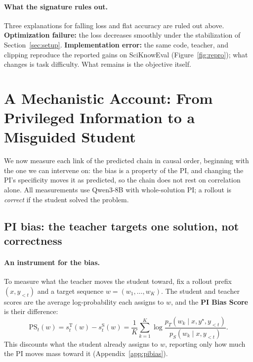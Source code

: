 \documentclass{article}
\newcommand{\ysol}{y^{\star}}               %
\newcommand{\sstud}{s^{\mathrm{S}}}          %
\newcommand{\steach}{s^{\mathrm{T}}}         %
\newcommand{\pibias}{\mathrm{PS}}            %
\begin{document}
\newcommand{\sddelta}[1]{%
  \ifnum\fpeval{#1 > 0}=1
    \textbf{\textcolor{chgpos}{$+#1$}}%
  \else
    \ifnum\fpeval{#1 < 0}=1
      \textbf{\textcolor{chgneg}{$#1$}}%
    \else
      \textbf{\textcolor{gray}{0.0}}%
    \fi
  \fi
}
\vspace{-5pt}
\paragraph{What the signature rules out.}
\label{sec:rulesout}
Three explanations for falling loss and flat accuracy are ruled out above. \textbf{Optimization failure:} the loss decreases smoothly under the stabilization of Section~\ref{sec:setup}. \textbf{Implementation error:} the same code, teacher, and clipping reproduce the reported gains on SciKnowEval (Figure~\ref{fig:repro}); what changes is task difficulty. What remains is the objective itself.
\section{A Mechanistic Account: From Privileged Information to a Misguided Student}
\label{sec:chain}

We now measure each link of the predicted chain in causal order, beginning with the one we can intervene on: the bias is a property of the PI, and changing the PI's specificity moves it as predicted, so the chain does not rest on correlation alone. All measurements use Qwen3-8B with whole-solution PI; a rollout is \textit{correct} if the student solved the problem.

\subsection{PI bias: the teacher targets one solution, not correctness}
\label{sec:arg3}

\paragraph{An instrument for the bias.}
To measure what the teacher moves the student toward, fix a rollout prefix $(x,y_{<t})$ and a target sequence $w=(w_1,\dots,w_K)$. The student and teacher scores are the average log-probability each assigns to $w$, and the \textbf{PI Bias Score} is their difference:
\begin{equation}
\pibias_t(w)
=
\steach_t(w)-\sstud_t(w)
=
\frac{1}{K}\sum_{k=1}^{K}
\log
\frac{p_T(w_k\mid x,\ysol,y_{<t})}
{p_S(w_k\mid x,y_{<t})}.
\label{eq:pibias}
\end{equation}
This discounts what the student already assigns to $w$, reporting only how much the PI moves mass toward it (Appendix~\ref{app:pibias}).
\end{document}
